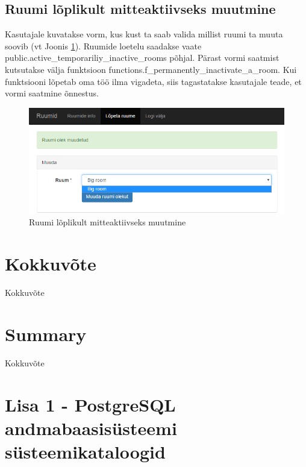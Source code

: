 \documentclass[a4paper,12pt]{article} %
\begin{document}
\subsection{Ruumi lõplikult mitteaktiivseks muutmine}
Kasutajale kuvatakse vorm, kus kust ta saab valida millist ruumi ta muuta soovib (vt Joonis \ref{fig_näidisrakendus_vorm}). Ruumide loetelu saadakse vaate  public.active\_temporariliy\_inactive\_rooms põhjal. Pärast vormi saatmist kutsutakse välja funktsioon functions.f\_permanently\_inactivate\_a\_room. Kui funktsiooni lõpetab oma töö ilma vigadeta, siis tagastatakse kasutajale teade, et vormi saatmine õnnestus.
\begin{figure}[H]
\begin{center}
\includegraphics[bb=0 0 764 317,scale=0.8]{./diagrams/sample-app-form.png}
\caption{Ruumi lõplikult mitteaktiivseks muutmine}
\label{fig_näidisrakendus_vorm}
\end{center}
\end{figure}

\section{Kokkuvõte}
Kokkuvõte

\pagebreak

\section{Summary}
Kokkuvõte

\pagebreak




\pagebreak

\section*{Lisa 1 - PostgreSQL andmabaasisüsteemi süsteemikataloogid}
\label{lisa1}
\end{document}

